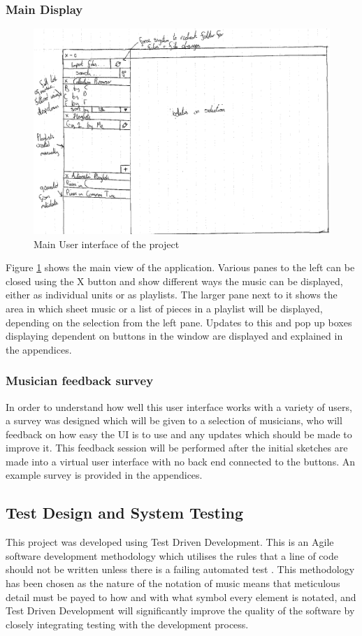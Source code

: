 \subsubsection{Main Display}
\begin{figure}[H]
    \includegraphics[width=400pt]{designs/main}
    \caption{Main User interface of the project}
    \label{fig:main}
\end{figure}
Figure \ref{fig:main} shows the main view of the application. Various panes to the left can be closed using the X button and show different ways the music can be displayed, either as individual units or as playlists. The larger pane next to it shows the area in which sheet music or a list of pieces in a playlist will be displayed, depending on the selection from the left pane. Updates to this and pop up boxes displaying dependent on buttons in the window are displayed and explained in the appendices.
\subsubsection{Musician feedback survey}
In order to understand how well this user interface works with a variety of users, a survey was designed which will be given to a selection of musicians, who will feedback on how easy the UI is to use and any updates which should be made to improve it. This feedback session will be performed after the initial sketches are made into a virtual user interface with no back end connected to the buttons. An example survey is provided in the appendices.
\subsection{Test Design and System Testing}
This project was developed using Test Driven Development. This is an Agile software development methodology which utilises the rules that a line of code should not be written unless there is a failing automated test \parencite{TDD}. This methodology has been chosen as the nature of the notation of music means that meticulous detail must be payed to how and with what symbol every element is notated, and Test Driven Development will significantly improve the quality of the software by closely integrating testing with the development process.

